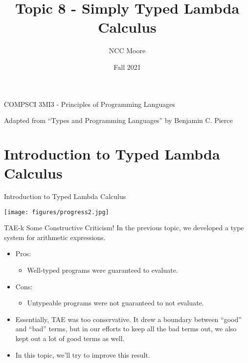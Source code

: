 \documentclass[11pt]{beamer}
\author{NCC Moore}
\title{Topic 8 - Simply Typed Lambda Calculus}
\institute{McMaster University}
\date{Fall 2021}
\begin{document}
\begin{frame}
\center
COMPSCI 3MI3 - Principles of Programming Languages
\titlepage

Adapted from ``Types and Programming Languages'' by Benjamin C. Pierce 
\end{frame}

\begin{frame}
\tableofcontents
\end{frame}

\section[Intro]{Introduction to Typed Lambda Calculus}
\begin{frame}[fragile=singleslide]{Introduction to Typed Lambda Calculus}
\begin{center}
\texttt{[image: figures/progress2.jpg]}
\end{center}
\end{frame}

\begin{frame}[fragile=singleslide]{TAE-k Some Constructive Criticism!}
In the previous topic, we developed a type system for arithmetic expressions.  
\begin{itemize}
\item Pros:
\begin{itemize}
\item Well-typed programs were guaranteed to evaluate.  
\end{itemize}
\item Cons:
\begin{itemize}
\item Untypeable programs were not guaranteed to not evaluate.
\end{itemize}
\item Essentially, TAE was too conservative.  It drew a boundary between ``good'' and ``bad'' terms, but in our efforts to keep all the bad terms out, we also kept out a lot of good terms as well. 
\item In this topic, we'll try to improve this result.  
\end{itemize}
\end{frame}
\end{document}
